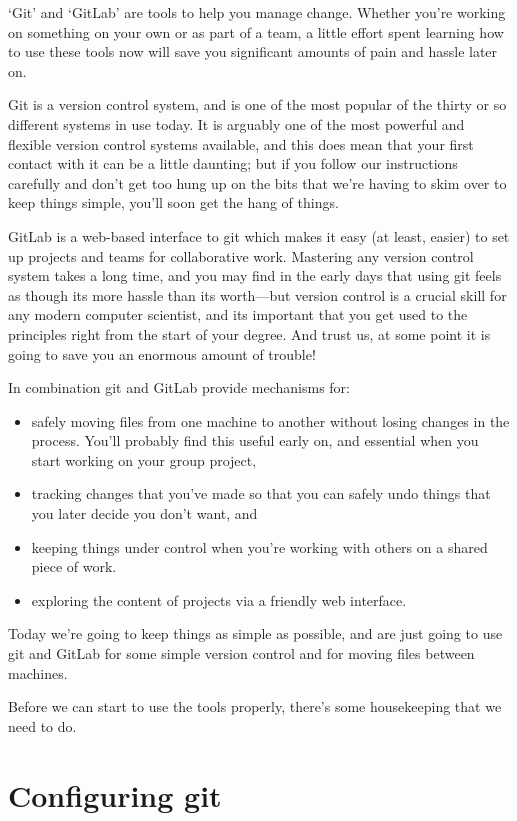`Git' and `GitLab' are tools to help you manage change. Whether you're working on something on your own or as part of a team, a little effort spent learning how to use these tools now will save you significant amounts of pain and hassle later on. 

Git is a version control system, and is one of the most popular of the thirty or so different systems in use today. It is arguably one of the most powerful and flexible version control systems available, and this does mean that your first contact with it can be a little daunting; but if you follow our instructions carefully and don't get too hung up on the bits that we're having to skim over to keep things simple, you'll soon get the hang of things. 

GitLab is a web-based interface to git which makes it easy (at least, easier) to set up projects and teams for collaborative work. Mastering any version control system takes a long time, and you may find in the early days that using git feels as though its more hassle than its worth---but version control is a crucial skill for any modern computer scientist, and its important that you get used to the principles right from the start of your degree. And trust us, at some point it is going to save you an enormous amount of trouble!

In combination git and GitLab provide mechanisms for:
\begin{itemize}
\item safely moving files from one machine to another without losing changes in the process. You'll probably find this useful early on, and essential when you start working on your group project,
\item tracking changes that you've made so that you can safely undo things that you later decide you don't want, and
\item keeping things under control when you're working with others on a shared piece of work.
\item exploring the content of projects via a friendly web interface.
\end{itemize}

Today we're going to keep things as simple as possible, and are just going to use git and GitLab for some simple version control and for moving files between machines.

Before we can start to use the tools properly, there's some housekeeping that we need to do. 

\section{Configuring git}

